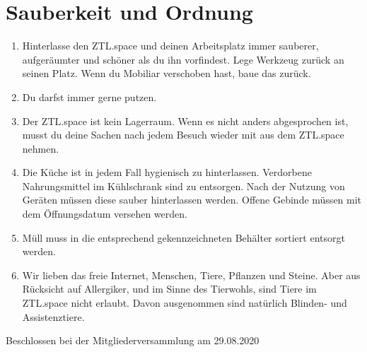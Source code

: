 \documentclass[a4paper, 12pt, numbers=withenddot,]{scrartcl}
\begin{document}
\newpage

\section{Sauberkeit und Ordnung}
\begin{enumerate}[label=\alph*)]
	\item Hinterlasse den ZTL.space und deinen Arbeitsplatz immer sauberer, aufgeräumter
und schöner als du ihn vorfindest. Lege Werkzeug zurück an seinen Platz. Wenn
du Mobiliar verschoben hast, baue das zurück.
	\item Du darfst immer gerne putzen.
	\item Der ZTL.space ist kein Lagerraum. Wenn es nicht anders abgesprochen ist, musst
du deine Sachen nach jedem Besuch wieder mit aus dem ZTL.space nehmen.
	\item Die Küche ist in jedem Fall hygienisch zu hinterlassen. Verdorbene Nahrungsmittel
im Kühlschrank sind zu entsorgen. Nach der Nutzung von Geräten müssen diese
sauber hinterlassen werden. Offene Gebinde müssen mit dem Öffnungsdatum
versehen werden.
	\item Müll muss in die entsprechend gekennzeichneten Behälter sortiert entsorgt
werden.
	\item Wir lieben das freie Internet, Menschen, Tiere, Pflanzen und Steine. Aber aus
Rücksicht auf Allergiker, und im Sinne des Tierwohls, sind Tiere im ZTL.space
nicht erlaubt. Davon ausgenommen sind natürlich Blinden- und Assistenztiere.
\end{enumerate}



\vspace{2.5cm}

\noindent Beschlossen bei der Mitgliederversammlung am 29.08.2020
\end{document}
